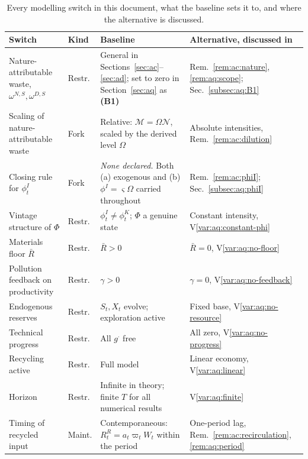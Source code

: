 \begin{table}[H]
\centering
\caption{Every modelling switch in this document, what the baseline sets it to, and where the alternative is discussed.}
\label{tab:baseline:switches}
\setlength{\tabcolsep}{4pt}
\renewcommand{\arraystretch}{1.05}
\begin{tabular}{@{}p{}p{}p{}p{}@{}}
\toprule
Switch & Kind & Baseline & Alternative, discussed in \\
\midrule
Nature-attributable waste, $\omega^{N,S},\omega^{D,S}$
& Restr.
& General in Sections~\ref{sec:ac}--\ref{sec:ad}; set to zero in Section~\ref{sec:aq} as \textbf{(B1)}
& Rem.~\ref{rem:ac:nature}, \ref{rem:aq:scope}; Sec.~\ref{subsec:aq:B1} \\
\addlinespace[0.2em]
Scaling of nature-attributable waste
& Fork
& Relative: $\mathcal M=\Omega\mathcal N$, scaled by the derived level $\Omega$
& Absolute intensities, Rem.~\ref{rem:ac:dilution} \\
\addlinespace[0.2em]
Closing rule for $\phi^I_t$
& Fork
& \emph{None declared.} Both (a) exogenous and (b) $\phi^I=\varsigma\Omega$ carried throughout
& Rem.~\ref{rem:ac:phiI}; Sec.~\ref{subsec:aq:phiI} \\
\addlinespace[0.2em]
Vintage structure of $\Phi$
& Restr.
& $\phi^I_t\neq\phi^K_t$; $\Phi$ a genuine state
& Constant intensity, V\ref{var:aq:constant-phi} \\
\addlinespace[0.2em]
Materials floor $\bar R$
& Restr.
& $\bar R>0$
& $\bar R=0$, V\ref{var:aq:no-floor} \\
\addlinespace[0.2em]
Pollution feedback on productivity
& Restr.
& $\gamma>0$
& $\gamma=0$, V\ref{var:aq:no-feedback} \\
\addlinespace[0.2em]
Endogenous reserves
& Restr.
& $S_t,X_t$ evolve; exploration active
& Fixed base, V\ref{var:aq:no-resource} \\
\addlinespace[0.2em]
Technical progress
& Restr.
& All $g^\cdot$ free
& All zero, V\ref{var:aq:no-progress} \\
\addlinespace[0.2em]
Recycling active
& Restr.
& Full model
& Linear economy, V\ref{var:aq:linear} \\
\addlinespace[0.2em]
Horizon
& Restr.
& Infinite in theory; finite $T$ for all numerical results
& V\ref{var:aq:finite} \\
\midrule
Timing of recycled input
& Maint.
& Contemporaneous: $R^R_t=a_t\varpi_tW_t$ within the period
& One-period lag, Rem.~\ref{rem:ac:recirculation}, \ref{rem:aq:period} \\

\end{tabular}
\end{table}
